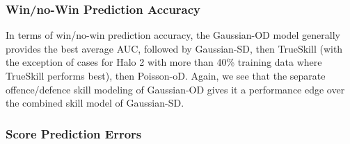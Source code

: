 \documentclass[runningheads,a4paper]{llncs}
\begin{document}

\subsubsection{Win/no-Win Prediction Accuracy }

In terms of win/no-win prediction accuracy,
the Gaussian-OD model generally
provides the best average AUC, followed by Gaussian-SD, then
TrueSkill (with the exception of cases for Halo 2 with more than 40\%
training data where TrueSkill performs best), then Poisson-oD.
Again, we see that
the separate offence/defence skill modeling of Gaussian-OD gives
it a performance edge over the combined skill model of Gaussian-SD.



\subsubsection{Score Prediction Errors}
\end{document}

